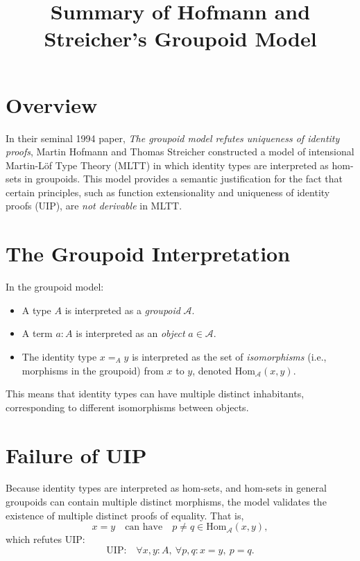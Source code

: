 \documentclass{article}
\title{Summary of Hofmann and Streicher's Groupoid Model}
\author{}
\date{}
\begin{document}
\maketitle

\section*{Overview}

In their seminal 1994 paper, \emph{The groupoid model refutes uniqueness of identity proofs}, Martin Hofmann and Thomas Streicher constructed a model of intensional Martin-L\"of Type Theory (MLTT) in which identity types are interpreted as hom-sets in groupoids. This model provides a semantic justification for the fact that certain principles, such as function extensionality and uniqueness of identity proofs (UIP), are \emph{not derivable} in MLTT.

\section*{The Groupoid Interpretation}

In the groupoid model:
\begin{itemize}
  \item A type $A$ is interpreted as a \emph{groupoid} $\mathcal{A}$.
  \item A term $a : A$ is interpreted as an \emph{object} $a \in \mathcal{A}$.
  \item The identity type $x =_A y$ is interpreted as the set of \emph{isomorphisms} (i.e., morphisms in the groupoid) from $x$ to $y$, denoted $\mathrm{Hom}_{\mathcal{A}}(x, y)$.
\end{itemize}

This means that identity types can have multiple distinct inhabitants, corresponding to different isomorphisms between objects.

\section*{Failure of UIP}

Because identity types are interpreted as hom-sets, and hom-sets in general groupoids can contain multiple distinct morphisms, the model validates the existence of multiple distinct proofs of equality. That is,
\[
  x = y \quad \text{can have} \quad p \neq q \in \mathrm{Hom}_{\mathcal{A}}(x, y),
\]
which refutes UIP:
\[
  \text{UIP:} \quad \forall x, y : A,\ \forall p, q : x = y,\ p = q.
\]
\end{document}
